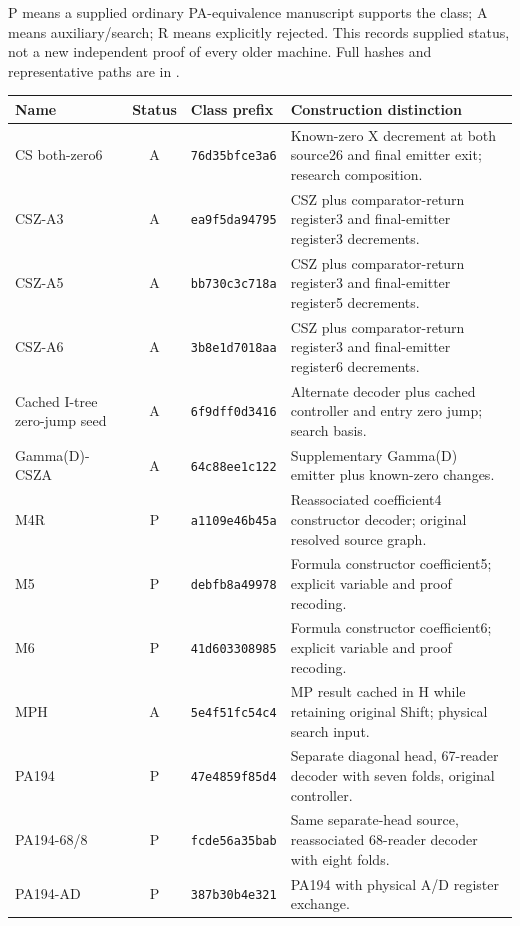 \noindent P means a supplied ordinary PA-equivalence manuscript supports the class; A means auxiliary/search; R means explicitly rejected. This records supplied status, not a new independent proof of every older machine. Full hashes and representative paths are in .
\small
\begin{longtable}{@{}>{\raggedright\arraybackslash}p{}cp{}>{\raggedright\arraybackslash}p{}@{}}
\toprule Name & Status & Class prefix & Construction distinction\\\midrule
\endhead
CS both-zero6 & A & \texttt{76d35bfce3a6} & Known-zero X decrement at both source26 and final emitter exit; research composition.\\[3pt]
CSZ-A3 & A & \texttt{ea9f5da94795} & CSZ plus comparator-return register3 and final-emitter register3 decrements.\\[3pt]
CSZ-A5 & A & \texttt{bb730c3c718a} & CSZ plus comparator-return register3 and final-emitter register5 decrements.\\[3pt]
CSZ-A6 & A & \texttt{3b8e1d7018aa} & CSZ plus comparator-return register3 and final-emitter register6 decrements.\\[3pt]
Cached I-tree zero-jump seed & A & \texttt{6f9dff0d3416} & Alternate decoder plus cached controller and entry zero jump; search basis.\\[3pt]
Gamma(D)-CSZA & A & \texttt{64c88ee1c122} & Supplementary Gamma(D) emitter plus known-zero changes.\\[3pt]
M4R & P & \texttt{a1109e46b45a} & Reassociated coefficient4 constructor decoder; original resolved source graph.\\[3pt]
M5 & P & \texttt{debfb8a49978} & Formula constructor coefficient5; explicit variable and proof recoding.\\[3pt]
M6 & P & \texttt{41d603308985} & Formula constructor coefficient6; explicit variable and proof recoding.\\[3pt]
MPH & A & \texttt{5e4f51fc54c4} & MP result cached in H while retaining original Shift; physical search input.\\[3pt]
PA194 & P & \texttt{47e4859f85d4} & Separate diagonal head, 67-reader decoder with seven folds, original controller.\\[3pt]
PA194-68/8 & P & \texttt{fcde56a35bab} & Same separate-head source, reassociated 68-reader decoder with eight folds.\\[3pt]
PA194-AD & P & \texttt{387b30b4e321} & PA194 with physical A/D register exchange.\\[3pt]

\end{longtable}
